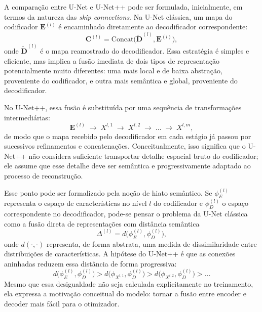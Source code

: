 \documentclass[tcc,capa]{texufpel}
\begin{document}
A comparação entre U-Net e U-Net++ pode ser formulada, inicialmente, em termos da natureza das \textit{skip connections}. Na U-Net clássica, um mapa do codificador \(\mathbf{E}^{(l)}\) é encaminhado diretamente ao decodificador correspondente:
\begin{equation}
	\mathbf{C}^{(l)}
	=
	\mathrm{Concat}\big(\tilde{\mathbf{D}}^{(l)}, \mathbf{E}^{(l)}\big),
\end{equation}
onde \(\tilde{\mathbf{D}}^{(l)}\) é o mapa reamostrado do decodificador. Essa estratégia é simples e eficiente, mas implica a fusão imediata de dois tipos de representação potencialmente muito diferentes: uma mais local e de baixa abstração, proveniente do codificador, e outra mais semântica e global, proveniente do decodificador.

No U-Net++, essa fusão é substituída por uma sequência de transformações intermediárias:
\begin{equation}
	\mathbf{E}^{(l)}
	\;\rightarrow\;
	X^{l,1}
	\;\rightarrow\;
	X^{l,2}
	\;\rightarrow\;
	\dots
	\;\rightarrow\;
	X^{l,m},
\end{equation}
de modo que o mapa recebido pelo decodificador em cada estágio já passou por sucessivos refinamentos e concatenações. Conceitualmente, isso significa que o U-Net++ não considera suficiente transportar detalhe espacial bruto do codificador; ele assume que esse detalhe deve ser semântica e progressivamente adaptado ao processo de reconstrução.

Esse ponto pode ser formalizado pela noção de hiato semântico. Se \(\phi_E^{(l)}\) representa o espaço de características no nível \(l\) do codificador e \(\phi_D^{(l)}\) o espaço correspondente no decodificador, pode-se pensar o problema da U-Net clássica como a fusão direta de representações com distância semântica
\begin{equation}
	\Delta^{(l)} = d\big(\phi_E^{(l)}, \phi_D^{(l)}\big),
\end{equation}
onde \(d(\cdot,\cdot)\) representa, de forma abstrata, uma medida de dissimilaridade entre distribuições de características. A hipótese do U-Net++ é que as conexões aninhadas reduzem essa distância de forma progressiva:
\begin{equation}
	d\big(\phi_E^{(l)}, \phi_D^{(l)}\big)
	>
	d\big(\phi_{X^{l,1}}, \phi_D^{(l)}\big)
	>
	d\big(\phi_{X^{l,2}}, \phi_D^{(l)}\big)
	>
	\dots
\end{equation}
Mesmo que essa desigualdade não seja calculada explicitamente no treinamento, ela expressa a motivação conceitual do modelo: tornar a fusão entre encoder e decoder mais fácil para o otimizador.
\end{document}
